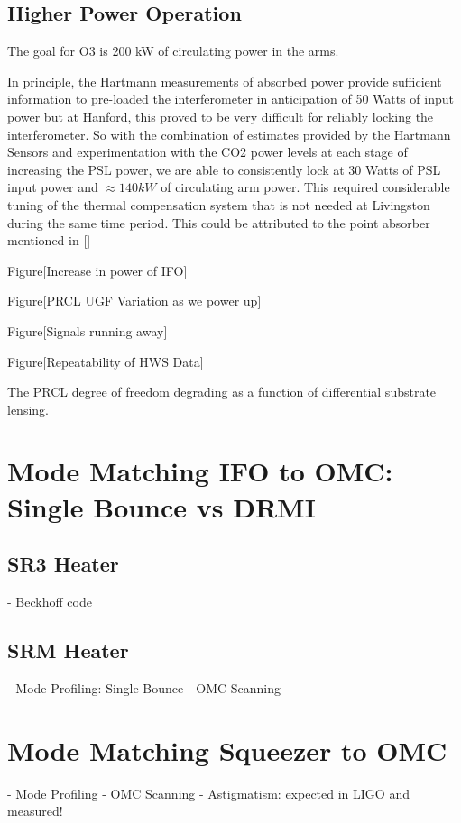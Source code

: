 	
\subsection{Higher Power Operation}
	The goal for O3 is 200 kW of circulating power in the arms.
	
	In principle, the Hartmann measurements of absorbed power provide sufficient information to pre-loaded the interferometer in anticipation of 50 Watts of input power but at Hanford, this proved to be very difficult for reliably locking the interferometer. So with the combination of estimates provided by the Hartmann Sensors and experimentation with the CO2 power levels at each stage of increasing the PSL power, we are able to consistently lock at 30 Watts of PSL input power and $\approx 140 kW$ of circulating arm power.  This required considerable tuning of the thermal compensation system that is not needed at Livingston during the same time period.  This could be attributed to the point absorber mentioned in []


		Figure[Increase in power of IFO]
		
		Figure[PRCL UGF Variation as we power up]
		
		Figure[Signals running away]
		
		Figure[Repeatability of HWS Data]
		
		The PRCL degree of freedom degrading as a function of differential substrate lensing.
	

\section{Mode Matching IFO to OMC: Single Bounce vs DRMI}
	\subsection{SR3 Heater}
	- Beckhoff code


	\subsection{SRM Heater}
	- Mode Profiling: Single Bounce
	- OMC Scanning

\section{Mode Matching Squeezer to OMC}
	- Mode Profiling
	- OMC Scanning
- Astigmatism: expected in LIGO and measured!